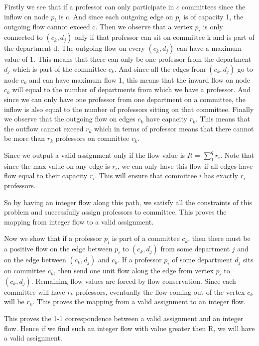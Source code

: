 \documentclass[11pt]{article}
\begin{document}
Firstly we see that if a professor can only participate in $c$ committees since the inflow on node $p_i$ is c. And since each outgoing edge on $p_i$ is of capacity 1, the outgoing flow cannot exceed c. Then we observe that a vertex $p_i$ is only connected to $(c_k,d_j)$ only if that professor can sit on committee k and is part of the department d. The outgoing flow on every $(c_k,d_j)$ can have a maximum value of 1. This means that there can only be one professor from the department $d_j$ which is part of the committee $c_k$. And since all the edges from $(c_k,d_j)$ go to node $c_k$ and can have maximum flow 1, this means that the inward flow on node $c_k$ will equal to the number of departments from which we have a professor. And since we can only have one professor from one department on a committee, the inflow is also equal to the number of professors sitting on that committee. Finally we observe that the outgoing flow on edges $c_k$ have capacity $r_k$. This means that the outflow cannot exceed $r_k$ which in terms of professor means that there cannot be more than $r_k$ professors on committee $c_k$. 

Since we output a valid assignment only if the flow value is $R$ = $\sum\limits_{1}^{q}r_i$. Note that since the max value on any edge is $r_i$, we can only have this flow if all edges have flow equal to their capacity $r_i$. This will ensure that committee $i$ has exactly $r_i$ professors. 

So by having an integer flow along this path, we satisfy all the constraints of this problem and successfully assign professors to committee. This proves the mapping from integer flow to a valid assignment.


Now we show that if a professor $p_i$ is part of a committee $c_k$, then there must be a positive flow on the edge between $p_i$ to $(c_k,d_j)$ from some department $j$ and on the edge between $(c_k,d_j)$ and $c_k$. If a professor $p_i$ of some department $d_j$ sits on committee $c_k$, then send one unit flow along the edge from vertex $p_i$ to $(c_k,d_j)$. Remaining flow values are forced by flow conservation. Since each committee will have $r_k$ professors, eventually the flow coming out of the vertex $c_k$ will be $r_k$. This proves the mapping from a valid assignment to an integer flow.


This proves the 1-1 correspondence between a valid assignment and an integer flow. Hence if we find such an integer flow with value greater then R, we will have a valid assignment.
\end{document}
